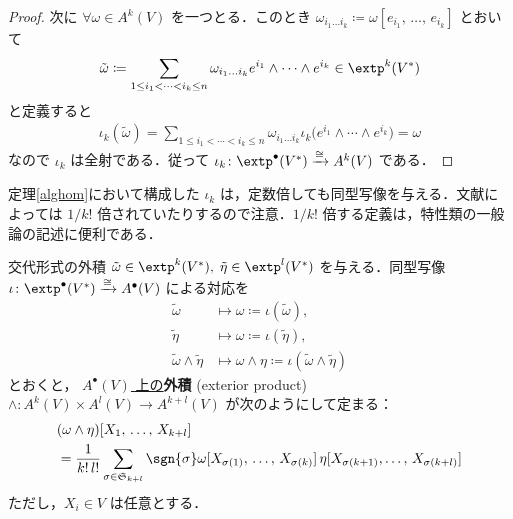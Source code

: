 \documentclass[geometry_main]{subfiles}
\begin{document}
\begin{proof}
	次に $\forall \omega \in A^k(V)$ を一つとる．このとき $\omega_{i_1 \dots i_k} \coloneqq \omega[e_{i_1},\, \dots ,\, e_{i_k}]$ とおいて
	\begin{align} 
		\tilde{\omega} \coloneqq \sum_{1 \le i_1 < \cdots < i_k \le n} \omega_{i_1 \dots i_k} e^{i_1} \wedge \cdots \wedge e^{i_k} \in \extp^k(V^*)
	\end{align}
	と定義すると
	\begin{align} 
		\iota_k(\tilde{\omega}) = \sum_{1 \le i_1 < \cdots < i_k \le n} \omega_{i_1 \dots i_k} \iota_k \bigl( e^{i_1} \wedge \cdots \wedge e^{i_k} \bigr) = \omega
	\end{align}
	なので $\iota_k$ は全射である．従って $\iota_k \colon \extp^\bullet(V^*) \xrightarrow{\cong} A^k(V)$ である．
\end{proof}

\begin{marker} 
	定理\ref{alghom}において構成した $\iota_k$ は，定数倍しても同型写像を与える．文献によっては $1/k!$ 倍されていたりするので注意．$1/k!$ 倍する定義は，特性類の一般論の記述に便利である．
\end{marker}

\begin{mycol}[label=lem.op]{交代形式の外積}
	$\tilde{\omega} \in \extp^k(V^*),\; \tilde{\eta} \in \extp^l(V^*)$ を与える．同型写像 $\iota \colon \extp^\bullet(V^*) \xrightarrow{\cong} A^\bullet(V)$ による対応を
	\begin{align} 
		\tilde{\omega} &\mapsto \omega \coloneqq \iota(\tilde{\omega}), \\
		\tilde{\eta} &\mapsto \omega \coloneqq \iota(\tilde{\eta}), \\
		\tilde{\omega}\wedge \tilde{\eta} &\mapsto \omega \wedge \eta \coloneqq \iota(\tilde{\omega} \wedge \tilde{\eta})
	\end{align}
	とおくと， \underline{$A^\bullet(V)$ 上の}\textbf{外積} (exterior product) $\wedge \colon A^k(V) \times A^l(V) \to A^{k+l}(V)$ が次のようにして定まる：
	\begin{align} 
		&(\omega \wedge \eta)[X_1,\, \dots ,\, X_{k+l}] \\
		&= \frac{1}{k !\, l !} \sum_{\sigma \in \mathfrak{S}_{k+l}} \sgn{\sigma} \omega[X_{\sigma(1)},\, \dots ,\, X_{\sigma(k)}]\, \eta[X_{\sigma(k+1)},\dots ,\, X_{\sigma(k+l)}]
	\end{align}
	ただし，$X_i \in V$ は任意とする．
\end{mycol}
\end{document}
